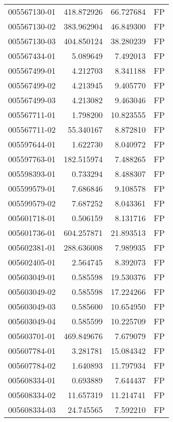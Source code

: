 \begin{tabular}{lrrl}
005567130-01 &  418.872926 &      66.727684 &   FP \\
005567130-02 &  383.962904 &      46.849300 &   FP \\
005567130-03 &  404.850124 &      38.280239 &   FP \\
005567434-01 &    5.089649 &       7.492013 &   FP \\
005567499-01 &    4.212703 &       8.341188 &   FP \\
005567499-02 &    4.213945 &       9.405770 &   FP \\
005567499-03 &    4.213082 &       9.463046 &   FP \\
005567711-01 &    1.798200 &      10.823555 &   FP \\
005567711-02 &   55.340167 &       8.872810 &   FP \\
005597644-01 &    1.622730 &       8.040972 &   FP \\
005597763-01 &  182.515974 &       7.488265 &   FP \\
005598393-01 &    0.733294 &       8.488307 &   FP \\
005599579-01 &    7.686846 &       9.108578 &   FP \\
005599579-02 &    7.687252 &       8.043361 &   FP \\
005601718-01 &    0.506159 &       8.131716 &   FP \\
005601736-01 &  604.257871 &      21.893513 &   FP \\
005602381-01 &  288.636008 &       7.989935 &   FP \\
005602405-01 &    2.564745 &       8.392073 &   FP \\
005603049-01 &    0.585598 &      19.530376 &   FP \\
005603049-02 &    0.585598 &      17.224266 &   FP \\
005603049-03 &    0.585600 &      10.654950 &   FP \\
005603049-04 &    0.585599 &      10.225709 &   FP \\
005603701-01 &  469.849676 &       7.679079 &   FP \\
005607784-01 &    3.281781 &      15.084342 &   FP \\
005607784-02 &    1.640893 &      11.797934 &   FP \\
005608334-01 &    0.693889 &       7.644437 &   FP \\
005608334-02 &   11.657319 &      11.214741 &   FP \\
005608334-03 &   24.745565 &       7.592210 &   FP \\

\end{tabular}
